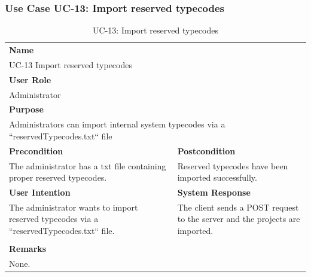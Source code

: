 \subsubsection{Use Case UC-13: Import reserved typecodes}\label{subsubsec:use-case-uc-13:-import-reserved-typecodes}

\begin{table}[H]
    \centering
    \begin{tabular}{|p{}|p{}|}

        \hline
        \multicolumn{2}{|l|}{\rowcolor{gray!50}\textbf{Name}} \\
        \multicolumn{2}{|l|}{UC-13 Import reserved typecodes} \\ \hline

        \multicolumn{2}{|l|}{\rowcolor{gray!50}\textbf{User Role}} \\
        \multicolumn{2}{|l|}{Administrator} \\ \hline

        \multicolumn{2}{|l|}{\rowcolor{gray!50}\textbf{Purpose}} \\
        \multicolumn{2}{|p{1\textwidth}|}{Administrators can import internal system typecodes via a ``reservedTypecodes.txt`` file} \\ \hline

        \rowcolor{gray!50}\textbf{Precondition} & \rowcolor{gray!50}\textbf{Postcondition} \\
        The administrator has a txt file containing proper reserved typecodes.
        &
        Reserved typecodes have been imported successfully.\\ \hline

        \rowcolor{gray!50}\textbf{User Intention} & \rowcolor{gray!50}\textbf{System Response} \\
        The administrator wants to import reserved typecodes via a ``reservedTypecodes.txt`` file.
        &
        The client sends a POST request to the server and the projects are imported. \\ \hline

        & \\ \hline

        \multicolumn{2}{|l|}{\rowcolor{gray!50}\textbf{Remarks}} \\
        \multicolumn{2}{|p{1\textwidth}|}{None.} \\ \hline
    \end{tabular}
    \caption{UC-13: Import reserved typecodes}
    \label{tab:uc-import-reserved-typecodes}
\end{table}

